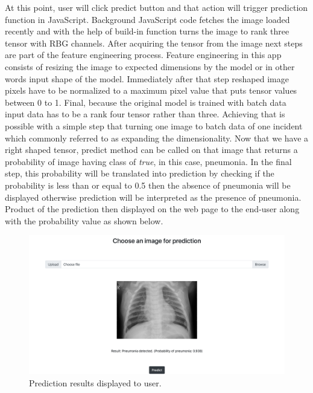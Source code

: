 At this point, user will click predict button and that action will trigger prediction function in JavaScript.
Background JavaScript code fetches the image loaded recently and with the help of build-in function turns the image to rank three tensor with RBG channels.
After acquiring the tensor from the image next steps are part of the feature engineering process.
Feature engineering in this app consists of resizing the image to expected dimensions by the model or in other words input shape of the model.
Immediately after that step reshaped image pixels have to be normalized to a maximum pixel value that puts tensor values between 0 to 1.
Final, because the original model is trained with batch data input data has to be a rank four tensor rather than three.
Achieving that is possible with a simple step that turning one image to batch data of one incident which commonly referred to as expanding the dimensionality.
Now that we have a right shaped tensor, predict method can be called on that image that returns a probability of image having class of \emph{true}, in this case, pneumonia.
In the final step, this probability will be translated into prediction by checking if the probability is less than or equal to 0.5 then the absence of pneumonia will be displayed otherwise prediction will be interpreted as the presence of pneumonia.
Product of the prediction then displayed on the web page to the end-user along with the probability value as shown below.

\begin{figure}[H]
    \centering
    \includegraphics[width=\textwidth]{img/resultimg.png}
    \caption{Prediction results displayed to user.}
    \label{fig:appresult}
\end{figure}



